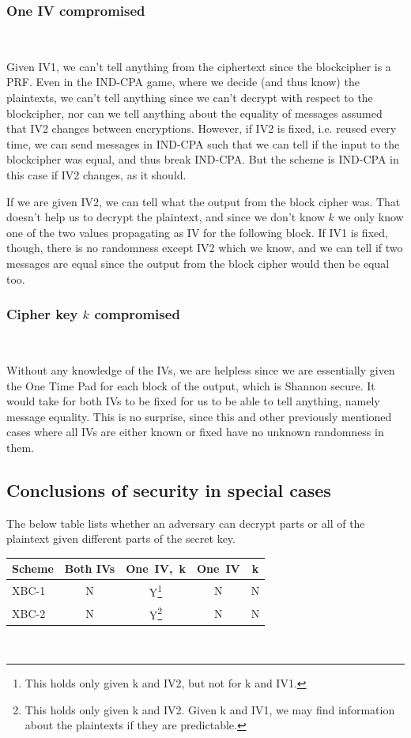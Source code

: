 \documentclass[conference]{IEEEtran}
\begin{document}
\subsubsection{One IV compromised} \

Given IV1, we can't tell anything from the ciphertext since the blockcipher is a PRF. Even in the IND-CPA game, where we decide (and thus know) the plaintexts, we can't tell anything since we can't decrypt with respect to the blockcipher, nor can we tell anything about the equality of messages assumed that IV2 changes between encryptions. However, if IV2 is fixed, i.e. reused every time, we can send messages in IND-CPA such that we can tell if the input to the blockcipher was equal, and thus break IND-CPA. But the scheme is IND-CPA in this case if IV2 changes, as it should. \

If we are given IV2, we can tell what the output from the block cipher was. That doesn't help us to decrypt the plaintext, and since we don't know $k$ we only know one of the two values propagating as IV for the following block. If IV1 is fixed, though, there is no randomness except IV2 which we know, and we can tell if two messages are equal since the output from the block cipher would then be equal too.

\subsubsection{Cipher key $k$ compromised} \

Without any knowledge of the IVs, we are helpless since we are essentially given the One Time Pad for each block of the output, which is Shannon secure. It would take for both IVs to be fixed for us to be able to tell anything, namely message equality. This is no surprise, since this and other previously mentioned cases where all IVs are either known or fixed have no unknown randomness in them.

\subsection{Conclusions of security in special cases}

The below table lists whether an adversary can decrypt parts or all of the plaintext given different parts of the secret key. \\

\begin{minipage}{6cm} %
\begin{tabular}{| l | c c c c | }
\hline
  Scheme & Both IVs & One\ IV,\ k & One\ IV & k \\ \hline
  XBC-1 & N & Y\footnote{This holds only given k and IV2, but not for k and IV1.} & N & N \\
  XBC-2 & N & Y\footnote{This holds only given k and IV2. Given k and IV1, we may find information
  about the plaintexts if they are predictable.} & N & N \\
\hline
\end{tabular}
\end{minipage} \\
\end{document}
